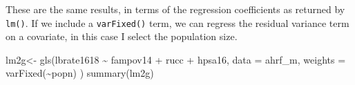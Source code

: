 \documentclass[
  letterpaper,
  DIV=11,
  numbers=noendperiod]{scrreprt}
\newenvironment{Shaded}{\begin{snugshade}}{\end{snugshade}}
\newcommand{\AttributeTok}[1]{\textcolor[rgb]{0.40,0.45,0.13}{#1}}
\newcommand{\FunctionTok}[1]{\textcolor[rgb]{0.28,0.35,0.67}{#1}}
\newcommand{\NormalTok}[1]{\textcolor[rgb]{0.00,0.23,0.31}{#1}}
\newcommand{\OtherTok}[1]{\textcolor[rgb]{0.00,0.23,0.31}{#1}}
\newcommand{\SpecialCharTok}[1]{\textcolor[rgb]{0.37,0.37,0.37}{#1}}
\begin{document}
These are the same results, in terms of the regression coefficients as
returned by \texttt{lm()}. If we include a \texttt{varFixed()} term, we
can regress the residual variance term on a covariate, in this case I
select the population size.

\begin{Shaded}
\begin{Highlighting}[]
\NormalTok{lm2g}\OtherTok{\textless{}{-}} \FunctionTok{gls}\NormalTok{(lbrate1618 }\SpecialCharTok{\textasciitilde{}}\NormalTok{  fampov14 }\SpecialCharTok{+}\NormalTok{ rucc }\SpecialCharTok{+}\NormalTok{ hpsa16,}
          \AttributeTok{data =}\NormalTok{ ahrf\_m, }
          \AttributeTok{weights =} \FunctionTok{varFixed}\NormalTok{(}\SpecialCharTok{\textasciitilde{}}\NormalTok{popn) )}
\FunctionTok{summary}\NormalTok{(lm2g)}
\end{Highlighting}
\end{Shaded}
\end{document}
